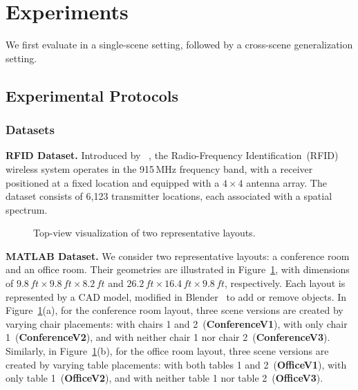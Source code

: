 
\section{Experiments}\label{sec_evaluation}
We first evaluate \ourSystem in a single-scene setting, followed by a cross-scene generalization setting.





\subsection{Experimental Protocols}\label{sec_experimental_setting}


\subsubsection{Datasets}

\textbf{RFID Dataset.}
Introduced by \nerft~\cite{zhao2023nerf}, the Radio-Frequency Identification~(RFID) wireless system operates in the 915\,MHz frequency band, with a receiver positioned at a fixed location and equipped with a $4 \times 4$ antenna array. 
The dataset consists of 6,123 transmitter locations, each associated with a spatial spectrum.

\begin{figure}[tp]
\centering
	\vspace{-0.2in}
\caption{Top-view visualization of two representative layouts.}
	\label{fig_exp_3d}
\end{figure}

\textbf{MATLAB Dataset.}  
We consider two representative layouts: a conference room and an office room. 
Their geometries are illustrated in Figure~\ref{fig_exp_3d}, with dimensions of \(9.8\,\textit{ft} \times 9.8\,\textit{ft} \times 8.2\,\textit{ft}\) and \(26.2\,\textit{ft} \times 16.4\,\textit{ft} \times 9.8\,\textit{ft}\), respectively.
Each layout is represented by a CAD model, modified in Blender~\cite{blender_soft} to add or remove objects.
In Figure~\ref{fig_exp_3d}(a), for the conference room layout, three scene versions are created by varying chair placements: with chairs 1 and 2~(\textbf{ConferenceV1}), with only chair 1~(\textbf{ConferenceV2}), and with neither chair 1 nor chair 2~(\textbf{ConferenceV3}). 
Similarly, in Figure~\ref{fig_exp_3d}(b), for the office room layout, three scene versions are created by varying table placements: with both tables 1 and 2~(\textbf{OfficeV1}), with only table 1~(\textbf{OfficeV2}), and with neither table 1 nor table 2~(\textbf{OfficeV3}).


